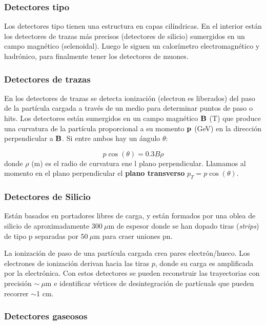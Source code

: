 \subsubsection{Detectores tipo}

Los detectores tipo tienen una estructura en capas cilíndricas. En el interior están los detectores de trazas más precisos (detectores de silicio) sumergidos en un campo magnético (selenoidal). Luego le siguen un calorímetro electromagnético y hadrónico, para finalmente tener los detectores de muones.

\subsubsection{Detectores de trazas}

En los detectores de trazas se detecta ionización (electron es liberados) del paso de la partícula cargada a través de un medio para determinar puntos de paso o hits. Los detectores están sumergidos en un campo magnético $\mathbf{B}$ (T) que produce una curvatura de la partícula proporcional a su momento $\mathbf{p}$ (GeV) en la dirección perpendicular a $\mathbf{B}$. Si entre ambos hay un ángulo $\theta$:

\begin{equation}
	p \cos (\theta) = 0.3B\rho
\end{equation}
donde $\rho$ (m) es el radio de curvatura ene l plano perpendicular. Llamamos al momento en el plano perpendicular el \textbf{plano transverso} $p_T = p \cos (\theta)$. 

\subsubsection{Detectores de Silicio}

Están basados en portadores libres de carga, y están formados por una oblea de silicio de aproximadamente $300 \ \mu$m de espesor donde se han dopado tiras (\textit{strips}) de tipo p separadas por  $50 \ \mu$m para craer uniones pn. 

La ionización de paso de una partícula cargada crea pares electrón/hueco. Los electrones de ionización derivan hacia las tiras $p$, donde su carga es amplificada por la electrónica. Con estos detectores se pueden reconstruir las trayectorias con precisión $\sim \ \mu$m e identificar vértices de desintegración de partícuals que pueden recorrer $\sim $1 cm.


\subsubsection{Detectores gaseosos}

